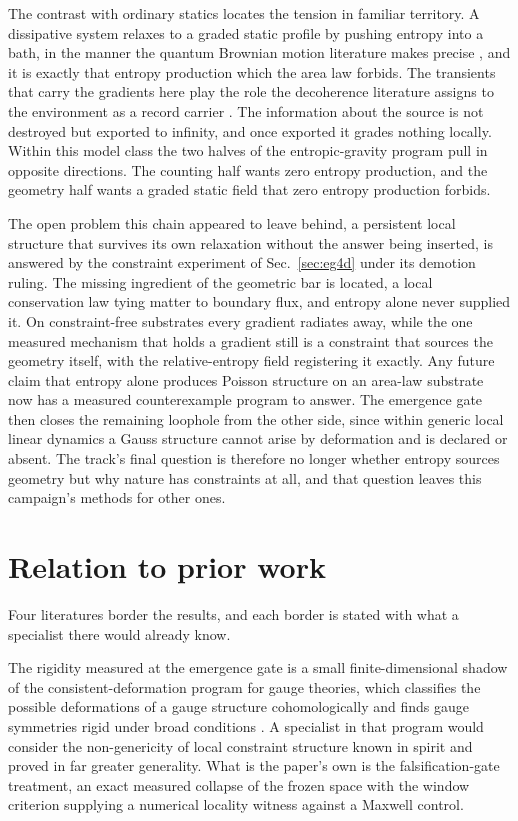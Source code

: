 \documentclass[aps,pre,reprint,nofootinbib]{revtex4-2}
\begin{document}
The contrast with ordinary statics locates the tension in familiar
territory.  A dissipative system relaxes to a graded static profile
by pushing entropy into a bath, in the manner the quantum Brownian
motion literature makes precise \cite{CaldeiraLeggett1983}, and it
is exactly that entropy production which the area law forbids.  The
transients that carry the gradients here play the role the
decoherence literature assigns to the environment as a record
carrier \cite{Zurek2003}.  The information about the source is not
destroyed but exported to infinity, and once exported it grades
nothing locally.  Within this model class the two halves of the
entropic-gravity program pull in opposite directions.  The counting
half wants zero entropy production, and the geometry half wants a
graded static field that zero entropy production forbids.

The open problem this chain appeared to leave behind, a persistent
local structure that survives its own relaxation without the answer
being inserted, is answered by the constraint experiment of
Sec.~\ref{sec:eg4d} under its demotion ruling.  The missing
ingredient of the geometric bar is located, a local conservation
law tying matter to boundary flux, and entropy alone never supplied
it.  On constraint-free substrates every gradient radiates away,
while the one measured mechanism that holds a gradient still is a
constraint that sources the geometry itself, with the
relative-entropy field registering it exactly.  Any future claim
that entropy alone produces Poisson structure on an area-law
substrate now has a measured counterexample program to answer.  The
emergence gate then closes the remaining loophole from the other
side, since within generic local linear dynamics a Gauss structure
cannot arise by deformation and is declared or absent.  The track's
final question is therefore no longer whether entropy sources
geometry but why nature has constraints at all, and that question
leaves this campaign's methods for other ones.

\section{Relation to prior work}
\label{sec:related}

Four literatures border the results, and each border is stated with
what a specialist there would already know.

The rigidity measured at the emergence gate is a small
finite-dimensional shadow of the consistent-deformation program for
gauge theories, which classifies the possible deformations of a
gauge structure cohomologically and finds gauge symmetries rigid
under broad conditions \cite{BarnichHenneaux1993}.  A specialist in
that program would consider the non-genericity of local constraint
structure known in spirit and proved in far greater generality.
What is the paper's own is the falsification-gate treatment, an
exact measured collapse of the frozen space with the window
criterion supplying a numerical locality witness against a Maxwell
control.
\end{document}
